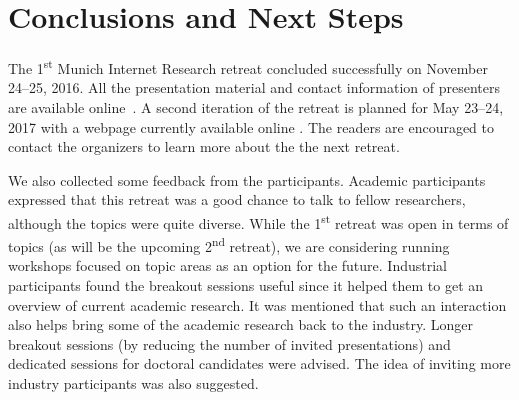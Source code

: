 \section{Conclusions and Next Steps}\label{sec:conclusion}

The 1\textsuperscript{st} Munich Internet Research retreat concluded
successfully on November 24--25, 2016. All the presentation material and
contact information of presenters are available online~\cite{mir-materials}. A
second iteration of the retreat is planned for May 23--24, 2017 with a webpage
currently available online \cite{mir2017}. The readers are encouraged to
contact the organizers to learn more about the the next retreat.

We also collected some feedback from the participants. Academic participants
expressed that this retreat was a good chance to talk to fellow researchers,
although the topics were quite diverse.  While the 1\textsuperscript{st}
retreat was open in terms of topics (as will be the upcoming
2\textsuperscript{nd} retreat), we are considering running workshops focused
on topic areas as an option for the future.  Industrial participants found the
breakout sessions useful since it helped them to get an overview of current
academic research. It was mentioned that such an interaction also helps bring
some of the academic research back to the industry. Longer breakout sessions
(by reducing the number of invited presentations) and dedicated sessions for
doctoral candidates were advised. The idea of inviting more industry
participants was also suggested.






